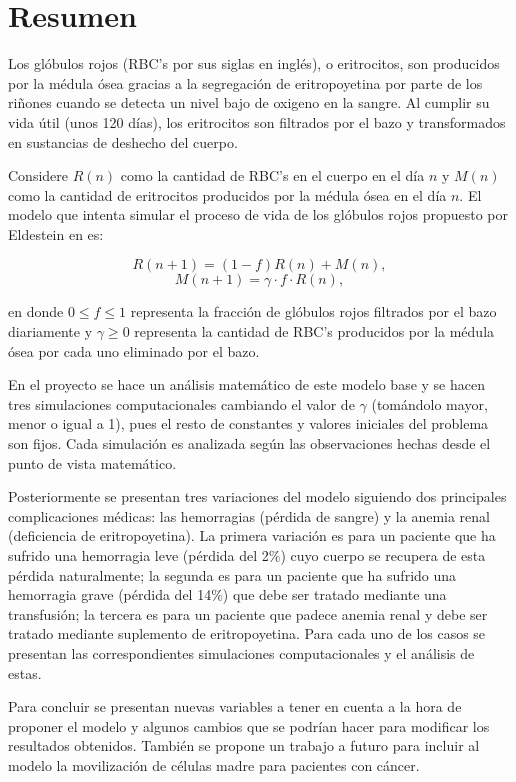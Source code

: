 \chapter*{Resumen}
Los glóbulos rojos (RBC's por sus siglas en inglés), o eritrocitos, son producidos por la médula ósea gracias a la segregación de eritropoyetina por parte de los riñones cuando se detecta un nivel bajo de oxigeno en la sangre. Al cumplir su vida útil (unos 120 días), los eritrocitos son filtrados por el bazo y transformados en sustancias de deshecho del cuerpo.

Considere $R(n)$ como la cantidad de RBC's en el cuerpo en el día $n$ y $M(n)$ como la cantidad de eritrocitos producidos por la médula ósea en el día $n$. El modelo que intenta simular el proceso de vida de los glóbulos rojos propuesto por Eldestein en \cite{edelstein1988mathematical} es:

$$R(n+1)=(1-f)R(n)+M(n),$$
$$M(n+1)=\gamma \cdot f\cdot R(n),$$

en donde $0\leq f \leq 1$ representa la fracción de glóbulos rojos filtrados por el bazo diariamente y $\gamma \geq 0$ representa la cantidad de RBC's producidos por la médula ósea por cada uno eliminado por el bazo. 

En el proyecto se hace un análisis matemático de este modelo base y se hacen tres simulaciones computacionales cambiando el valor de $\gamma$ (tomándolo mayor, menor o igual a 1), pues el resto de constantes y valores iniciales del problema son fijos. Cada simulación es analizada según las observaciones hechas desde el punto de vista matemático. 

Posteriormente se presentan tres variaciones del modelo siguiendo dos principales complicaciones médicas: las hemorragias (pérdida de sangre) y la anemia renal (deficiencia de eritropoyetina). La primera variación es para un paciente que ha sufrido una hemorragia leve (pérdida del 2$\%$) cuyo cuerpo se recupera de esta pérdida naturalmente; la segunda es para un paciente que ha sufrido una hemorragia grave (pérdida del 14$\%$) que debe ser tratado mediante una transfusión; la tercera es para un paciente que padece anemia renal y debe ser tratado mediante suplemento de eritropoyetina. Para cada uno de los casos se presentan las correspondientes simulaciones computacionales y el análisis de estas. 

Para concluir se presentan nuevas variables a tener en cuenta a la hora de proponer el modelo y algunos cambios que se podrían hacer para modificar los resultados obtenidos. También se propone un trabajo a futuro para incluir al modelo la movilización de células madre para pacientes con cáncer.

